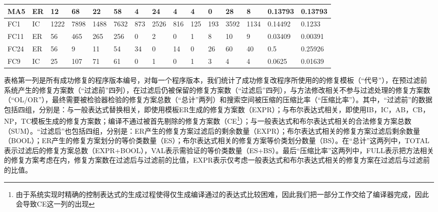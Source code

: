 \begin{landscape}
\begin{table}[]
\begin{tabular}{|l|l|l|l|l|l|l|l|l|l|l|l|l|l|l|}
		MA5             &       ER              & 12    & 68     & 22     & 58     & 4     & 24    & 4   & 4   & 0                       & 28           & 8           & 0.13793         & 0.13793        \\ \hline
		FC1                &       IC              & 1222  & 7898   & 1488   & 7632   & 873   & 2526  & 816 & 125 & 193                     & 3592         & 1134        & 0.14492         & 0.1233         \\ \hline
		FC11               &       ER              & 56    & 465    & 265    & 256    & 0     & 2     & 0   & 1   & 8                       & 10           & 9           & 0.03409         & 0.00391        \\ \hline
		FC24               &       ER              & 56    & 9      & 11     & 54     & 34    & 0     & 14  & 0   & 26                      & 60           & 40          & 0.5             & 0.25926        \\ \hline
		FC9                &       IC              & 25    & 107    & 71     & 61     & 0     & 1     & 0   & 1   & 3                       & 4            & 4           & 0.0625          & 0.01639        \\ \hline
	\end{tabular}
\end{table}
\end{landscape}


表格第一列是所有成功修复的程序版本编号，对每一个程序版本，我们统计了成功修复改程序所使用的的修复模板（“代号”），在预过滤前系统产生的修复方案数（“过滤前”四列），在过滤后仍被保留的修复方案数（“过滤后”四列），与方法修改相关不参与过滤处理的修复方案数（“OL/OR”），最终需要被检验器检验的修复方案总数（“总计”两列）和搜索空间被压缩的压缩比率（“压缩比率”）。其中，“过滤前”的数据包括四组，分别是：与一般表达式替换相关，即使用模板ER生成的修复方案数（EXPR）；与布尔表达式相关，即使用IB，IC，AB，CB，NP，TC模板生成的修复方案数；编译不通过被首先剔除的修复方案数（CE\footnote{由于系统实现时精确的控制表达式的生成过程使得仅生成编译通过的表达式比较困难，因此我们把一部分工作交给了编译器完成，因此会导致CE这一列的出现}）；与一般表达式和布尔表达式相关的合法修复方案总数（SUM）。“过滤后”也包括四组，分别是：ER产生的修复方案过滤后的剩余数量（EXPR）；布尔表达式相关的修复方案过滤后剩余数量（BOOL）；ER产生的修复方案划分的等价类数量（ES）；布尔表达式相关的修复方案等价类划分数量（BS）。在“总计”这两列中，TOTAL表示过滤后的修复方案总数（EXPR+BOOL），VAL表示需验证的等价类数量（ES+BS）。最后“压缩比率”这两列中，FULL表示把方法相关的修复方案考虑在内，修复方案数在过滤后与过滤前的比值，EXPR表示仅考虑一般表达式和布尔表达式相关的修复方案在过滤后与过滤前的比值。

